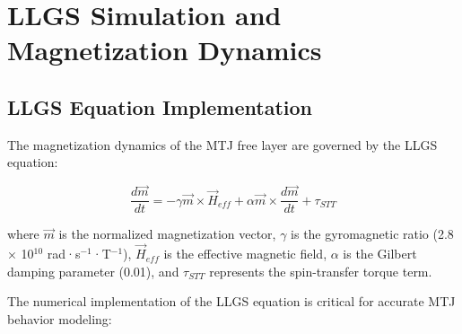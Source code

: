 \documentclass[conference]{IEEEtran}
\begin{document}
\section{LLGS Simulation and Magnetization Dynamics}

\subsection{LLGS Equation Implementation}

The magnetization dynamics of the MTJ free layer are governed by the LLGS equation:

\begin{equation}
\frac{d\vec{m}}{dt} = -\gamma \vec{m} \times \vec{H}_{eff} + \alpha \vec{m} \times \frac{d\vec{m}}{dt} + \tau_{STT}
\label{eq:llgs}
\end{equation}

where $\vec{m}$ is the normalized magnetization vector, $\gamma$ is the gyromagnetic ratio (2.8 × 10$^{10}$ rad·s$^{-1}$·T$^{-1}$), $\vec{H}_{eff}$ is the effective magnetic field, $\alpha$ is the Gilbert damping parameter (0.01), and $\tau_{STT}$ represents the spin-transfer torque term.

The numerical implementation of the LLGS equation is critical for accurate MTJ behavior modeling:
\end{document}
